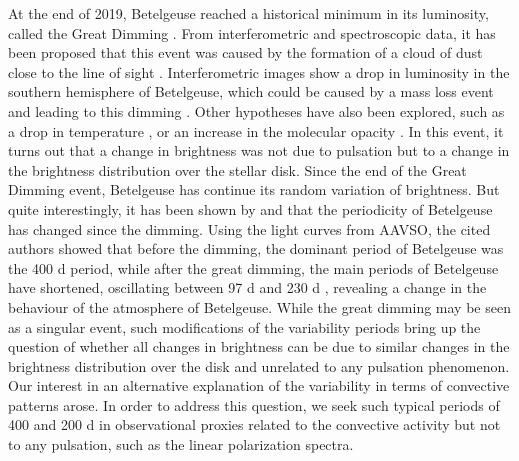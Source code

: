 \documentclass{aa}
\begin{document}
At the end of 2019, Betelgeuse reached a historical minimum in its luminosity, called the Great Dimming \citep{guinan_fall_2020}. 
From interferometric and spectroscopic data, it has been proposed that this event was caused by the formation of a cloud of dust close to the line of sight \citep{montarges_dusty_2021}. 
Interferometric images show a drop in luminosity in the southern hemisphere of Betelgeuse, which could be caused by a mass loss event and leading to this dimming \citep{dupree_great_2022}. Other hypotheses have also been explored, such as a drop in temperature \citep{harper_photospheric_2020}, or an increase in the molecular opacity \citep{kravchenko_atmosphere_2021}. 
In this event, it turns out that a change in brightness was not  due to pulsation but to a change in the 
brightness distribution over the stellar disk.
Since the end of the Great Dimming event, Betelgeuse has continue its random variation of brightness. 
But quite interestingly, 
it has been shown by \cite{jadlovsky_analysis_2023} and \cite{dupree_great_2022} that the periodicity of Betelgeuse has changed since the dimming. Using the light curves from AAVSO, 
the cited authors showed that before the dimming, the dominant period of Betelgeuse was the 400 d period, while after the great dimming, the main periods of Betelgeuse have shortened, oscillating between 97 d and 230 d \citep{dupree_great_2022}, revealing a change in the behaviour of the atmosphere of Betelgeuse.
While the great dimming may be seen as 
a singular event, such modifications of the variability periods bring up the question of whether all changes in brightness can be due to similar changes in the brightness 
distribution over the disk and unrelated to any pulsation phenomenon. 
Our interest in an alternative explanation of the variability
in terms  of convective patterns arose. In order to address this question, we seek such typical periods of 400 and 200 d in  
observational proxies related to the convective
activity but not to any pulsation, such as the linear polarization
spectra.\\
\end{document}
